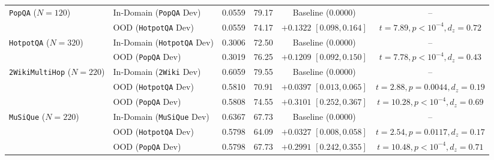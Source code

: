 \documentclass[11pt]{article}
\begin{document}
\begin{table}[t]
{\begin{tabular}{llcccc}
\multirow{2}{*}{\texttt{PopQA} ($N=120$)} & In-Domain (\texttt{PopQA} Dev) & 0.0559 & 79.17 & Baseline ($0.0000$) & -- \\
& OOD (\texttt{HotpotQA} Dev) & 0.0559 & 74.17 & $+0.1322$ $[0.098, 0.164]$ & $t=7.89, p<10^{-4}, d_z=0.72$ \\
\midrule
\multirow{2}{*}{\texttt{HotpotQA} ($N=320$)} & In-Domain (\texttt{HotpotQA} Dev) & 0.3006 & 72.50 & Baseline ($0.0000$) & -- \\
& OOD (\texttt{PopQA} Dev) & 0.3019 & 76.25 & $+0.1209$ $[0.092, 0.150]$ & $t=7.78, p<10^{-4}, d_z=0.43$ \\
\midrule
\multirow{3}{*}{\texttt{2WikiMultiHop} ($N=220$)} & In-Domain (\texttt{2Wiki} Dev) & 0.6059 & 79.55 & Baseline ($0.0000$) & -- \\
& OOD (\texttt{HotpotQA} Dev) & 0.5810 & 70.91 & $+0.0397$ $[0.013, 0.065]$ & $t=2.88, p=0.0044, d_z=0.19$ \\
& OOD (\texttt{PopQA} Dev) & 0.5808 & 74.55 & $+0.3101$ $[0.252, 0.367]$ & $t=10.28, p<10^{-4}, d_z=0.69$ \\
\midrule
\multirow{3}{*}{\texttt{MuSiQue} ($N=220$)} & In-Domain (\texttt{MuSiQue} Dev) & 0.6367 & 67.73 & Baseline ($0.0000$) & -- \\
& OOD (\texttt{HotpotQA} Dev) & 0.5798 & 64.09 & $+0.0327$ $[0.008, 0.058]$ & $t=2.54, p=0.0117, d_z=0.17$ \\
& OOD (\texttt{PopQA} Dev) & 0.5798 & 67.73 & $+0.2991$ $[0.242, 0.355]$ & $t=10.48, p<10^{-4}, d_z=0.71$ \\
\bottomrule
\end{tabular}
}
\end{table}
\end{document}

